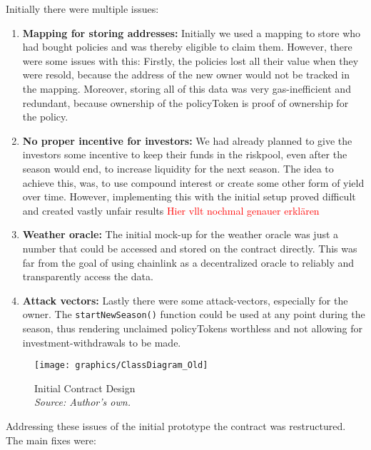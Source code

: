 \documentclass[11pt,a4paper]{article}
\begin{document}
		Initially there were multiple issues:
		\begin{enumerate}[1]
			\item \textbf{Mapping for storing addresses:} Initially we used a mapping to store who had bought policies and was thereby eligible to claim them.
				However, there were some issues with this: Firstly, the policies lost all their value when they were resold, because the address of the new owner would not be tracked in the mapping.
				Moreover, storing all of this data was very gas-inefficient and redundant, because ownership of the policyToken is proof of ownership for the policy.
			\item \textbf{No proper incentive for investors:} We had already planned to give the investors some incentive to keep their funds in the riskpool, even after the season would end, to increase liquidity for the next season.
				The idea to achieve this, was, to use compound interest or create some other form of yield over time.
				However, implementing this with the initial setup proved difficult and created vastly unfair results \textcolor{red}{Hier vllt nochmal genauer erkl\"aren}
			\item \textbf{Weather oracle:} The initial mock-up for the weather oracle was just a number that could be accessed and stored on the contract directly.
				This was far from the goal of using chainlink as a decentralized oracle to reliably and transparently access the data.
			\item \textbf{Attack vectors:} Lastly there were some attack-vectors, especially for the owner.
				The \texttt{startNewSeason()} function could be used at any point during the season, thus rendering unclaimed policyTokens worthless and not allowing for investment-withdrawals to be made.
		\end{enumerate}

		\begin{figure}[H]
			\centering
			\texttt{[image: graphics/ClassDiagram\_Old]}
			\caption{Initial Contract Design \\ \textit{Source: Author's own.}}
			\label{fig:initial-contract-design}
		\end{figure}

		Addressing these issues of the initial prototype the contract was restructured.
		The main fixes were:
\end{document}
